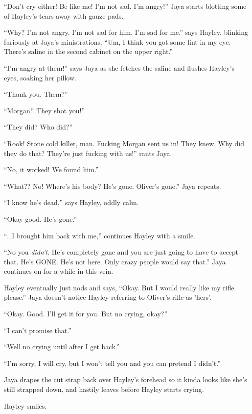 ``Don't cry either!  Be like me!  I'm not sad.  I'm angry!''  Jaya starts blotting some of Hayley's tears away with gauze pads.

``Why?  I'm not angry.  I'm not sad for him.  I'm sad for me.'' says Hayley, blinking furiously at Jaya's ministrations.  ``Um, I think you got some lint in my eye.  There's saline in the second cabinet on the upper right.''

``I'm angry at them!'' says Jaya as she fetches the saline and flushes Hayley's eyes, soaking her pillow.

``Thank you.  Them?''

``Morgan!!  They shot you!''

``They did?  Who did?''

``Rook!  Stone cold killer, man.  Fucking Morgan sent us in!  They knew.  Why did they do that?  They're just fucking with us!'' rants Jaya.

``No, it worked!  We found him.''

``What??  No!  Where's his body? He's gone.  Oliver's gone.'' Jaya repeats.

``I know he's dead,'' says Hayley, oddly calm.

``Okay good. He's gone.''

``...I brought him back with me,'' continues Hayley with a smile.

``No you \textit{didn't}.  He's completely gone and you are just going to have to accept that.  He's GONE.  He's not here.  Only crazy people would say that.''  Jaya continues on for a while in this vein.

Hayley eventually just nods and says, ``Okay.  But I would really like my rifle please.''  Jaya doesn't notice Hayley referring to Oliver's rifle as 'hers'.

``Okay.  Good.  I'll get it for you.  But no crying, okay?''

``I can't promise that.''

``Well no crying until after I get back.''

``I'm sorry, I will cry, but I won't tell you and you can pretend I didn't.''

Jaya drapes the cut strap back over Hayley's forehead so it kinda looks like she's still strapped down, and hastily leaves before Hayley starts crying.

Hayley smiles.





